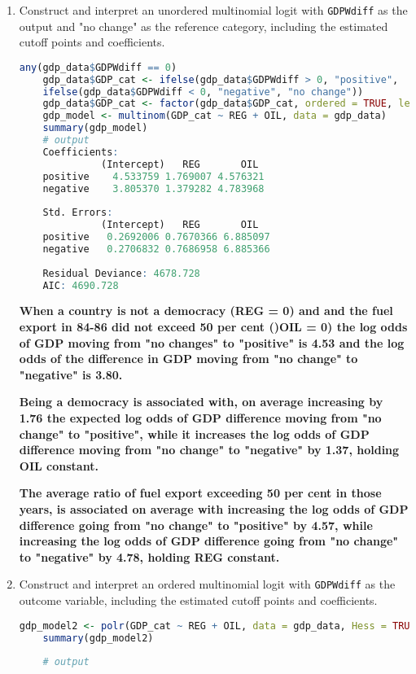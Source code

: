 \documentclass[12pt,letterpaper]{article}
\begin{document}
\begin{enumerate}
	\item Construct and interpret an unordered multinomial logit with \texttt{GDPWdiff} as the output and "no change" as the reference category, including the estimated cutoff points and coefficients.
\begin{lstlisting}[language=R]
	any(gdp_data$GDPWdiff == 0)
	gdp_data$GDP_cat <- ifelse(gdp_data$GDPWdiff > 0, "positive", 
	ifelse(gdp_data$GDPWdiff < 0, "negative", "no change"))
	gdp_data$GDP_cat <- factor(gdp_data$GDP_cat, ordered = TRUE, levels = c("no change", "positive", "negative"))
	gdp_model <- multinom(GDP_cat ~ REG + OIL, data = gdp_data)
	summary(gdp_model)
	# output
	Coefficients:          
	          (Intercept)   REG       OIL
	positive    4.533759 1.769007 4.576321
	negative    3.805370 1.379282 4.783968
	
	Std. Errors:         
	          (Intercept)   REG       OIL
	positive   0.2692006 0.7670366 6.885097
	negative   0.2706832 0.7686958 6.885366
	
	Residual Deviance: 4678.728 
	AIC: 4690.728 
\end{lstlisting}
\textbf{When a country is not a democracy (REG = 0) and and the fuel export in 84-86 did not exceed 50 per cent ()OIL = 0) the log odds of GDP moving from "no changes" to "positive" is 4.53 and the log odds of the difference in GDP moving from "no change" to "negative" is 3.80.}

\textbf{Being a democracy is associated with, on average increasing by 1.76 the expected log odds of GDP difference moving from "no change" to "positive", while it increases the log odds of GDP difference moving from "no change" to "negative" by 1.37, holding OIL constant.}

\textbf{The average ratio of fuel export exceeding 50 per cent in those years, is associated on average with increasing the log odds of GDP difference going from "no change" to "positive" by 4.57, while increasing the log odds of GDP difference going from "no change" to "negative" by 4.78, holding REG constant.}
	\item Construct and interpret an ordered multinomial logit with \texttt{GDPWdiff} as the outcome variable, including the estimated cutoff points and coefficients.
\begin{lstlisting}[language=R]
	gdp_model2 <- polr(GDP_cat ~ REG + OIL, data = gdp_data, Hess = TRUE)
	summary(gdp_model2)
	
	# output
	

\end{lstlisting}
\end{enumerate}
\end{document}

